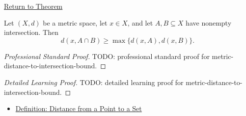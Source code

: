 \newpage
{}
\label{prf:metric-distance-to-intersection-bound}

\begin{remark*}[Return]
\hyperref[thm:metric-distance-to-intersection-bound]{Return to Theorem}
\end{remark*}

\begin{theorem*}
Let \((X,d)\) be a metric space, let \(x\in X\), and let
\(A,B\subseteq X\) have nonempty intersection.  Then
\[
  d(x,A\cap B)\geq \max\{d(x,A),d(x,B)\}.
\]
\end{theorem*}

\begin{proof}[Professional Standard Proof]
\LRAProofBodyStart
TODO: professional standard proof for metric-distance-to-intersection-bound.
\end{proof}

\begin{proof}[Detailed Learning Proof]
\LRAProofBodyStart
TODO: detailed learning proof for metric-distance-to-intersection-bound.
\end{proof}

\begin{remark*}
\end{remark*}

\begin{dependencies}
\begin{itemize}
  \item \hyperref[def:metric-point-set-distance]{Definition: Distance from a Point to a Set}
\end{itemize}
\end{dependencies}

\clearpage
